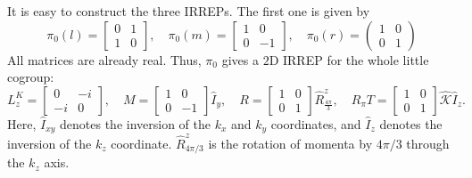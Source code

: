\documentclass[aps,prl,twocolumn,noshowpacs,superscriptaddress]{revtex4-1}
\def \K {\hat{\mathcal{K}}}
\begin{document}
It is easy to construct the three IRREPs. The first one is given by 
\begin{equation}
	\pi_0(l)=\begin{bmatrix}
		0 & 1\\
		1 & 0
	\end{bmatrix},\quad \pi_0(m)=\begin{bmatrix}
		1 & 0\\
		0 & -1
	\end{bmatrix},\quad
	\pi_0(r)=\begin{pmatrix}
		1 & 0\\
		0 & 1
	\end{pmatrix}
\end{equation}
All matrices are already real. Thus, $\pi_0$ gives a $2$D IRREP for the whole little cogroup:
\begin{equation}
	L_z^K=\begin{bmatrix}
		0 & -i\\
		-i & 0
	\end{bmatrix},\quad 
	M=\begin{bmatrix}
		1 & 0\\
		0 & -1
	\end{bmatrix}\hat{I}_{y},\quad 
	R=\begin{bmatrix}
		1 & 0\\
		0 & 1
	\end{bmatrix}\hat{R}^z_{\frac{4\pi}{3}},\quad 
	R_\pi T=\begin{bmatrix}
		1 & 0\\
		0 & 1
	\end{bmatrix}\K\hat{I}_z.
\end{equation}
Here, $\hat{I}_{xy}$ denotes the inversion of the $k_x$ and $k_y$ coordinates, and $\hat{I}_{z}$ denotes the inversion of the $k_z$ coordinate. $\hat{R}^z_{4\pi/3}$ is the rotation of momenta by $4\pi/3$ through the $k_z$ axis.
\end{document}
